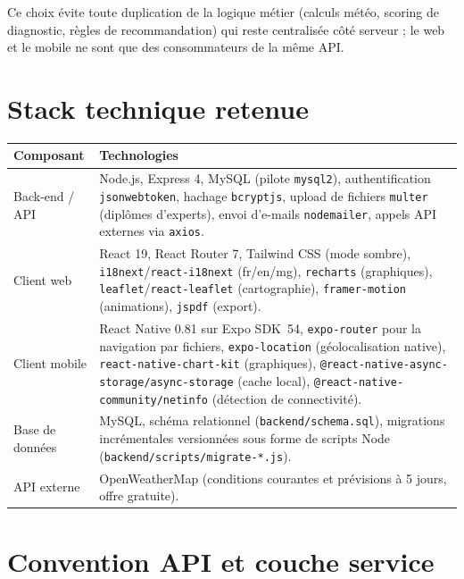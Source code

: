 \documentclass[12pt,a4paper]{report}
\begin{document}
Ce choix évite toute duplication de la logique métier (calculs météo, scoring de diagnostic, règles de recommandation) qui reste centralisée côté serveur ; le web et le mobile ne sont que des consommateurs de la même API.

\section{Stack technique retenue}

\begin{longtable}{p{3.5cm}p{10.5cm}}
\toprule
\textbf{Composant} & \textbf{Technologies} \\
\midrule
\endhead
Back-end / API & Node.js, Express 4, MySQL (pilote \texttt{mysql2}), authentification \texttt{jsonwebtoken}, hachage \texttt{bcryptjs}, upload de fichiers \texttt{multer} (diplômes d'experts), envoi d'e-mails \texttt{nodemailer}, appels API externes via \texttt{axios}. \\
Client web & React 19, React Router 7, Tailwind CSS (mode sombre), \texttt{i18next}/\texttt{react-i18next} (fr/en/mg), \texttt{recharts} (graphiques), \texttt{leaflet}/\texttt{react-leaflet} (cartographie), \texttt{framer-motion} (animations), \texttt{jspdf} (export). \\
Client mobile & React Native 0.81 sur Expo SDK~54, \texttt{expo-router} pour la navigation par fichiers, \texttt{expo-location} (géolocalisation native), \texttt{react-native-chart-kit} (graphiques), \texttt{@react-native-async-storage/async-storage} (cache local), \texttt{@react-native-community/netinfo} (détection de connectivité). \\
Base de données & MySQL, schéma relationnel (\texttt{backend/schema.sql}), migrations incrémentales versionnées sous forme de scripts Node (\texttt{backend/scripts/migrate-*.js}). \\
API externe & OpenWeatherMap (conditions courantes et prévisions à 5 jours, offre gratuite). \\
\bottomrule
\end{longtable}

\section{Convention API et couche service}
\end{document}

